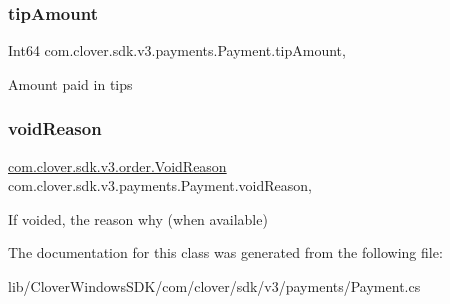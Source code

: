 \subsubsection{\texorpdfstring{tip\+Amount}{tipAmount}}
{\footnotesize\ttfamily Int64 com.\+clover.\+sdk.\+v3.\+payments.\+Payment.\+tip\+Amount\hspace{0.3cm}{\ttfamily [get]}, {\ttfamily [set]}}



Amount paid in tips 

\mbox{\label{classcom_1_1clover_1_1sdk_1_1v3_1_1payments_1_1_payment_a037af65f45c8fd866641b93efb74cfb5}} 
\subsubsection{\texorpdfstring{void\+Reason}{voidReason}}
{\footnotesize\ttfamily \hyperlink{namespacecom_1_1clover_1_1sdk_1_1v3_1_1order_acb5aac0c1f6aeeb5b636223a69d2dec2}{com.\+clover.\+sdk.\+v3.\+order.\+Void\+Reason} com.\+clover.\+sdk.\+v3.\+payments.\+Payment.\+void\+Reason\hspace{0.3cm}{\ttfamily [get]}, {\ttfamily [set]}}



If voided, the reason why (when available) 



The documentation for this class was generated from the following file\+:\begin{DoxyCompactItemize}
\item 
lib/\+Clover\+Windows\+S\+D\+K/com/clover/sdk/v3/payments/Payment.\+cs\end{DoxyCompactItemize}
